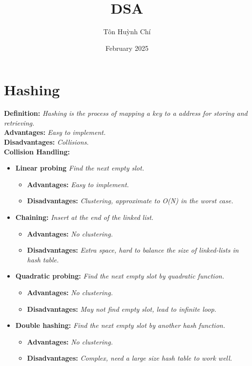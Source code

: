 \documentclass{article}
\title{DSA}
\author{Tôn Huỳnh Chí}
\date{February 2025}
\begin{document}
\maketitle

\section {Hashing}

\textbf{Definition:} \textit{Hashing is the process of mapping a key to a address for storing and retrieving.}\\
\textbf{Advantages:} \textit{Easy to implement.}\\
\textbf{Disadvantages:} \textit{Collisions.}\\

\textbf{Collision Handling:}

\begin{itemize}
    \item \textbf{Linear probing} \textit{Find the next empty slot.}
        \begin{itemize}
            \item \textbf{Advantages:} \textit{Easy to implement.}
            \item \textbf{Disadvantages:} \textit{Clustering, approximate to O(N) in the worst case.}
        \end{itemize}
    \item \textbf{Chaining:} \textit{Insert at the end of the linked list.}
        \begin{itemize}
            \item \textbf{Advantages:} \textit{No clustering.}
            \item \textbf{Disadvantages:} \textit{Extra space, hard to balance the size of linked-lists in hash table.}
        \end{itemize}
    \item \textbf{Quadratic probing:} \textit{Find the next empty slot by quadratic function.}
        \begin{itemize}
            \item \textbf{Advantages:} \textit{No clustering.}
            \item \textbf{Disadvantages:} \textit{May not find empty slot, lead to infinite loop.}
        \end{itemize}
    \item \textbf{Double hashing:} \textit{Find the next empty slot by another hash function.}
        \begin{itemize}
            \item \textbf{Advantages:} \textit{No clustering.}
            \item \textbf{Disadvantages:} \textit{Complex, need a large size hash table to work well.}
        \end{itemize}
\end{itemize}
\end{document}
